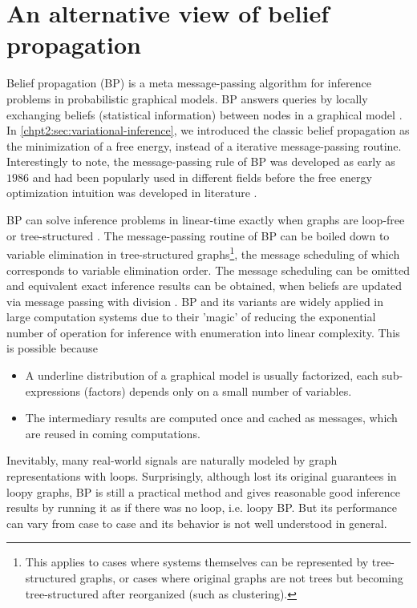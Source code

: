 \chapter{An alternative view of belief propagation}
\graphicspath{{source/chapter3/}}

Belief propagation (BP) is a meta message-passing algorithm for inference problems in probabilistic graphical models. BP answers queries by locally exchanging beliefs (statistical information) between nodes in a graphical model \cite{kschischang2001factor_graph, Bishop:2006:PRM:1162264}. In \autoref{chpt2:sec:variational-inference}, we introduced the classic belief propagation as the minimization of a free energy, instead of a iterative message-passing routine. Interestingly to note, the message-passing rule of BP was developed as early as $1986$ \cite{pearl1986b} and had been popularly used in different fields before the free energy optimization intuition was developed in literature \cite{yedidia2003understanding}.

BP can solve inference problems in linear-time exactly when graphs are loop-free or tree-structured \cite{kschischang2001factor_graph}. The message-passing routine of BP can be boiled down to variable elimination in tree-structured graphs\footnote{This applies to cases where systems themselves can be represented by tree-structured graphs, or cases where original graphs are not trees but becoming tree-structured after reorganized (such as clustering).}, the message scheduling of which corresponds to variable elimination order. The message scheduling can be omitted and equivalent exact inference results can be obtained, when beliefs are updated via message passing with division \cite[section~10.3]{koller2009pgm}. BP and its variants are widely applied in large computation systems due to their 'magic' of reducing the exponential number of operation for inference with enumeration into linear complexity. This is possible because 
\begin{itemize}
\item A underline distribution of a graphical model is usually factorized, each sub-expressions (factors) depends only on a small number of variables.
\item The intermediary results are computed once and cached as messages, which are reused in coming computations. 
\end{itemize}

Inevitably, many real-world signals are naturally modeled by graph representations with loops. Surprisingly, although lost its original guarantees in loopy graphs, BP is still a practical method and gives reasonable good inference results by running it as if there was no loop, i.e. loopy BP. But its performance can vary from case to case and its behavior is not well understood in general. 

